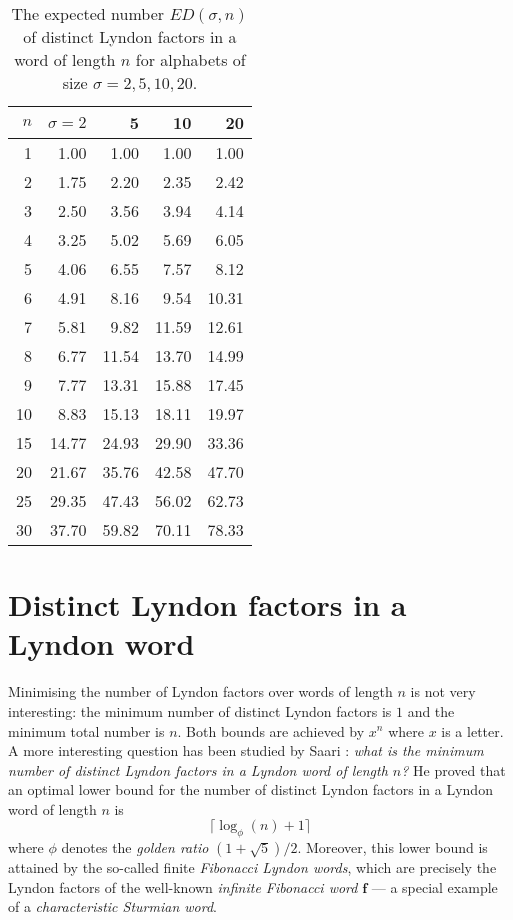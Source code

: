 \documentclass[11pt]{amsart}
\newcommand{\1}{\bar{1}}
\newcommand{\bbf}{\boldsymbol{f}}
\theoremstyle{plain}
\theoremstyle{definition}
\theoremstyle{remark}
\begin{document}
{\small
 \begin{table}[htb!]
 \centering
 \begin{tabular}{rrrrr}
 \hline
  $n$ & $\sigma = 2$ & 5 & 10 & 20 \\
  \hline
  1  &    1.00   &   1.00   &   1.00    &    1.00  \\
 2  &    1.75   &   2.20   &   2.35    &    2.42  \\
 3  &    2.50   &   3.56   &   3.94    &    4.14  \\
 4  &    3.25   &   5.02   &   5.69    &    6.05  \\
 5  &    4.06   &   6.55   &   7.57    &    8.12  \\
 6  &    4.91   &   8.16   &   9.54    &   10.31  \\
 7  &    5.81   &   9.82   &  11.59    &   12.61  \\
 8  &    6.77   &  11.54   &  13.70    &   14.99  \\
 9  &    7.77   &  13.31   &  15.88    &   17.45  \\
10  &    8.83   &  15.13   &  18.11    &   19.97  \\
15  &   14.77   &  24.93   &  29.90    &   33.36  \\
20  &   21.67   &  35.76   &  42.58    &   47.70  \\
25  &   29.35   &  47.43   &  56.02    &   62.73  \\
30  &   37.70   &  59.82   &  70.11    &   78.33  \\

\end{tabular}
\medskip
\caption{\label{table3}{\small The expected number $ED(\sigma,n)$ of distinct Lyndon factors in a word of length $n$ for alphabets of size $\sigma = 2, 5, 10, 20$.}}
  \end{table}
  }


\vspace*{-2em}
\section{Distinct Lyndon factors in a Lyndon word}
\label{sect-5}

Minimising the number of Lyndon factors over words of length $n$ is not very interesting:  the minimum number of distinct Lyndon factors is $1$ and the minimum total number is $n$. Both bounds are achieved by $x^n$ where $x$ is a letter.  A more interesting question has been studied by Saari \cite{kS14lynd}: \textit{what is the minimum number of  distinct Lyndon factors in a Lyndon word of length $n$?}  He proved that an optimal lower bound for the number of distinct Lyndon factors in a Lyndon word of length $n$ is 
\[
\lceil\log_{\phi}(n) + 1\rceil
\]
where $\phi$ denotes the \textit{golden ratio} $(1 + \sqrt{5})/2$. Moreover, this lower bound is attained by the so-called finite \textit{Fibonacci Lyndon words}, which are precisely the Lyndon factors of the well-known \textit{infinite Fibonacci word} $\bbf$ ---  a special example of a \textit{characteristic Sturmian word}.
\end{document}

